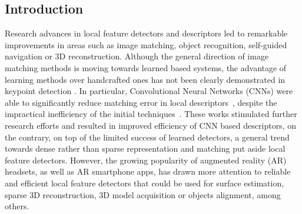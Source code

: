 \subsection{Introduction}
Research advances in local feature detectors and descriptors led to remarkable improvements in areas such as image matching, object recognition, self-guided navigation or 3D reconstruction. %
Although the general direction of image matching methods is moving towards learned based systems, the advantage of learning methods over handcrafted ones has not been clearly demonstrated in keypoint detection \cite{Karel_Vedaldi_BMVC_18}. 
In particular, Convolutional Neural Networks (CNNs) were able to significantly reduce matching error in local descriptors~\cite{HPatches}, despite the impractical inefficiency of the initial techniques~\cite{MatchNet15,Zagoruyko15}. 
These works stimulated further research efforts and resulted in improved efficiency of CNN based descriptors, 
on the contrary, on top of the limited success of learned detectors, a general trend towards dense rather than sparse representation and matching put aside local feature detectors. 
However, the growing popularity of augmented reality (AR) headsets, as well as AR smartphone apps, has drawn more attention to reliable and efficient local feature detectors that could be used for surface estimation, sparse 3D reconstruction, 3D model acquisition or objects alignment, among others. \par
